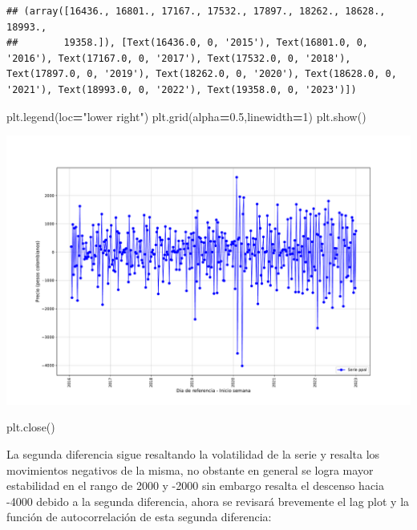 \documentclass[
]{book}
\newenvironment{Shaded}{\begin{snugshade}}{\end{snugshade}}
\newcommand{\DecValTok}[1]{\textcolor[rgb]{0.00,0.00,0.81}{#1}}
\newcommand{\FloatTok}[1]{\textcolor[rgb]{0.00,0.00,0.81}{#1}}
\newcommand{\NormalTok}[1]{#1}
\newcommand{\OperatorTok}[1]{\textcolor[rgb]{0.81,0.36,0.00}{\textbf{#1}}}
\newcommand{\StringTok}[1]{\textcolor[rgb]{0.31,0.60,0.02}{#1}}
\begin{document}
\begin{verbatim}
## (array([16436., 16801., 17167., 17532., 17897., 18262., 18628., 18993.,
##        19358.]), [Text(16436.0, 0, '2015'), Text(16801.0, 0, '2016'), Text(17167.0, 0, '2017'), Text(17532.0, 0, '2018'), Text(17897.0, 0, '2019'), Text(18262.0, 0, '2020'), Text(18628.0, 0, '2021'), Text(18993.0, 0, '2022'), Text(19358.0, 0, '2023')])
\end{verbatim}

\begin{Shaded}
\begin{Highlighting}[]
\NormalTok{plt.legend(loc}\OperatorTok{=}\StringTok{"lower right"}\NormalTok{)}
\NormalTok{plt.grid(alpha}\OperatorTok{=}\FloatTok{0.5}\NormalTok{,linewidth}\OperatorTok{=}\DecValTok{1}\NormalTok{)}
\NormalTok{plt.show()}
\end{Highlighting}
\end{Shaded}

\includegraphics{bookdown-demo_files/figure-latex/unnamed-chunk-114-99.pdf}

\begin{Shaded}
\begin{Highlighting}[]
\NormalTok{plt.close()}
\end{Highlighting}
\end{Shaded}

La segunda diferencia sigue resaltando la volatilidad de la serie y resalta los movimientos negativos de la misma, no obstante en general se logra mayor estabilidad en el rango de 2000 y -2000 sin embargo resalta el descenso hacia -4000 debido a la segunda diferencia, ahora se revisará brevemente el lag plot y la función de autocorrelación de esta segunda diferencia:
\end{document}
